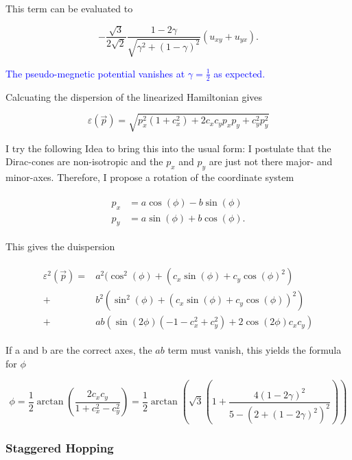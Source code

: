 \documentclass[../../../main.tex]{subfiles}
\begin{document}
This term can be evaluated to

\begin{equation}
	-\frac{\sqrt{3}}{2\sqrt{2}}\frac{1-2\gamma}{\sqrt{\gamma^2 + (1-\gamma)^2}}(u_{xy} + u_{yx}).
\end{equation}

\textcolor{blue}{The pseudo-megnetic potential vanishes at $\gamma = \frac12$ as expected.}

Calcuating the dispersion of the linearized Hamiltonian gives

\begin{equation}
	\varepsilon(\vec{p}) = \sqrt{p_x^2(1+c_x^2) + 2c_x c_y p_x p_y + c_y^2 p_y^2}
\end{equation}

I try the following Idea to bring this into the usual form: I postulate that the Dirac-cones are non-isotropic and the $p_x$ and $p_y$ are just not there major- and minor-axes. Therefore, I propose a rotation of the coordinate system

\begin{align}
	\begin{split}
		p_x &= a \cos(\phi) - b\sin(\phi) \\
		p_y &= a \sin(\phi) + b \cos(\phi).
	\end{split}
\end{align}

This gives the duispersion

\begin{align}
	\begin{split}
		\varepsilon^2(\vec{p}) = &a^2 (\cos^2(\phi) + (c_x \sin(\phi) + c_y \cos(\phi)^2) \\
		+ &b^2 (\sin^2(\phi) + (c_x \sin(\phi) + c_y \cos(\phi))^2) \\
		+ &ab (\sin(2\phi)(-1-c_x^2+c_y^2)+2\cos(2\phi)c_xc_y)
	\end{split}
\end{align}

If a and b are the correct axes, the $ab$ term must vanish, this yields the formula for $\phi$

\begin{equation}
	\phi = \frac12 \arctan(\frac{2c_x c_y}{1+c_x^2-c_y^2}) = \frac12 \arctan(\sqrt{3}\left(1+\frac{4(1-2\gamma)^2}{5-(2+(1-2\gamma)^2)^2}\right))
\end{equation}	

\subsubsection{Staggered Hopping}
\end{document}
